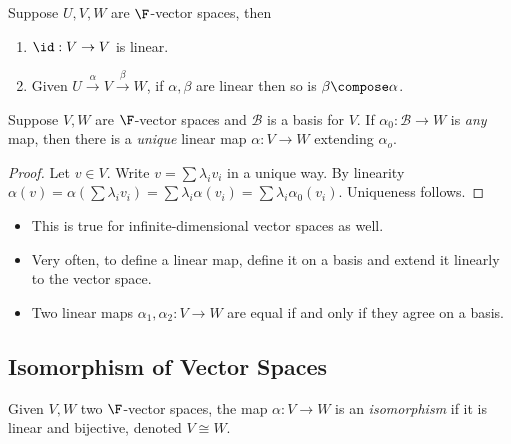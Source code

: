 \documentclass[a4paper]{article}
\newcommand*{\basis}{\mathcal}
\theoremstyle{definition}
\begin{document}
\begin{note}
  Suppose \(U, V, W\) are \(\F\)-vector spaces, then
  \begin{enumerate}
  \item \(\id: V\to V\) is linear.
  \item Given \(U \stackrel{\alpha}{\to} V \stackrel{\beta}{\to} W\), if \(\alpha, \beta\) are linear then so is \(\beta \compose \alpha\).
  \end{enumerate}
\end{note}

\begin{lemma}
  Suppose \(V, W\) are \(\F\)-vector spaces and \(\basis B\) is a basis for \(V\). If \(\alpha_0: \basis B\to W\) is \emph{any} map, then there is a \emph{unique} linear map \(\alpha: V\to W\) extending \(\alpha_o\).
\end{lemma}

\begin{proof}
  Let \(v\in V\). Write \(v = \sum \lambda_iv_i\) in a unique way. By linearity \(\alpha(v) = \alpha(\sum \lambda_iv_i) = \sum \lambda_i \alpha(v_i) = \sum \lambda_i \alpha_0(v_i)\). Uniqueness follows.
\end{proof}

\begin{note}\leavevmode
  \begin{itemize}
  \item This is true for infinite-dimensional vector spaces as well.
  \item Very often, to define a linear map, define it on a basis and extend it linearly to the vector space.
  \item Two linear maps \(\alpha_1,\alpha_2: V\to W\) are equal if and only if they agree on a basis.
  \end{itemize}
\end{note}

\subsection{Isomorphism of Vector Spaces}

\begin{definition}[Isomorphism]
  Given \(V, W\) two \(\F\)-vector spaces, the map \(\alpha:V\to W\) is an \emph{isomorphism} if it is linear and bijective, denoted \(V \cong W\).
\end{definition}
\end{document}
